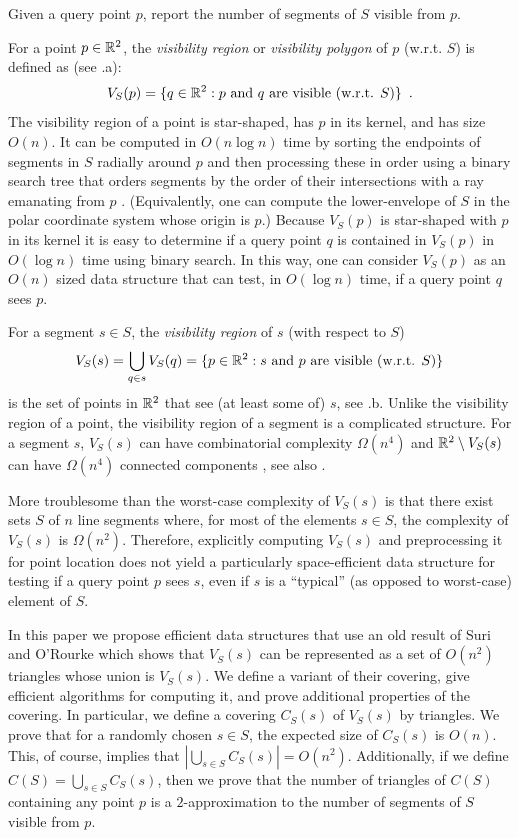 \documentclass{patmorin}
\begin{document}
\begin{prb}
  Given a query point $p$, report the number of segments of $S$ visible
  from $p$.
\end{prb}


For a point $p\in\mathbb{R}^2$, the \emph{visibility region} or \emph{visibility
polygon} of $p$ (w.r.t. $S$) is defined as (see .a):
\[
   V_S(p)=\{q\in\mathbb{R}^2:\mbox{$p$ and $q$ are visible (w.r.t. $S$)}\}
      \enspace .
\]
The visibility region of a point is star-shaped, has $p$ in its
kernel, and has size $O(n)$. It can be computed in $O(n\log n)$ time
by sorting the endpoints of segments in $S$ radially around $p$ and
then processing these in order using a binary search tree that orders
segments by the order of their intersections with a ray emanating from $p$
\cite{a85,so84}. (Equivalently, one can compute the lower-envelope of $S$
in the polar coordinate system whose origin is $p$.)  Because $V_S(p)$
is star-shaped with $p$ in its kernel it is easy to determine if a query
point $q$ is contained in $V_S(p)$ in $O(\log n)$ time using binary
search. In this way, one can consider $V_S(p)$ as an $O(n)$ sized data
structure that can test, in $O(\log n)$ time, if a query point $q$
sees $p$.

For a segment $s\in S$, the \emph{visibility region} of $s$ (with respect
to $S$)
\[
   V_S(s) = \bigcup_{q\in s} V_S(q)
          = \{p\in\mathbb{R}^2:\mbox{$s$ and $p$ are visible (w.r.t. $S$)} \}
\]
is the set of points in $\mathbb{R}^2$ that see (at least some of) $s$, see
.b.  Unlike the visibility region of a point,
the visibility region of a segment is a complicated structure.
For a segment $s$, $V_S(s)$ can have combinatorial complexity
$\Omega(n^4)$ and $\mathbb{R}^2\setminus V_S(s)$ can have $\Omega(n^4)$
connected components \cite[Figure~8.13]{o87}\cite[Lemma~12]{fhjmz08},
see also .

More troublesome than the worst-case complexity of $V_S(s)$ is that there
exist sets $S$ of $n$ line segments where, for most of the elements
$s\in S$, the complexity of $V_S(s)$ is $\Omega(n^2)$.  Therefore,
explicitly computing $V_S(s)$ and preprocessing it for point location
does not yield a particularly space-efficient data structure for testing
if a query point $p$ sees $s$, even if $s$ is a ``typical'' (as opposed
to worst-case) element of $S$.

In this paper we propose efficient data structures that use an old
result of Suri and O'Rourke \cite{so84} which shows that $V_S(s)$ can
be represented as a set of $O(n^2)$ triangles whose union is $V_S(s)$.
We define a variant of their covering, give efficient algorithms for
computing it, and prove additional properties of the covering. In
particular, we define a covering $C_S(s)$ of $V_S(s)$ by triangles.
We prove that for a randomly chosen $s\in S$, the expected size of
$C_S(s)$ is $O(n)$.  This, of course, implies that $|\bigcup_{s\in S}
C_S(s)|=O(n^2)$.  Additionally, if we define $C(S)=\bigcup_{s\in S}
C_S(s)$, then we prove that the number of triangles of $C(S)$ containing
any point $p$ is a $2$-approximation to the number of segments of $S$
visible from $p$.
\end{document}
